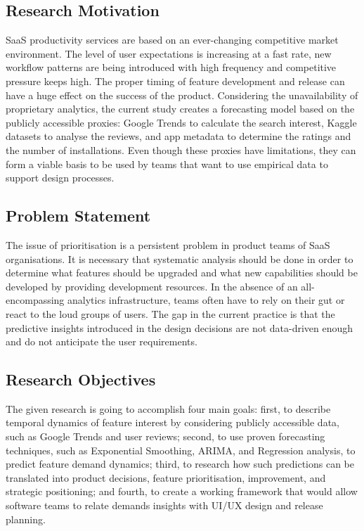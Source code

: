\subsection{Research Motivation}
SaaS productivity services are based on an ever-changing competitive market environment. The level of user expectations is increasing at a fast rate, new workflow patterns are being introduced with high frequency and competitive pressure keeps high. The proper timing of feature development and release can have a huge effect on the success of the product. Considering the unavailability of proprietary analytics, the current study creates a forecasting model based on the publicly accessible proxies: Google Trends to calculate the search interest, Kaggle datasets to analyse the reviews, and app metadata to determine the ratings and the number of installations. Even though these proxies have limitations, they can form a viable basis to be used by teams that want to use empirical data to support design processes.

\subsection{Problem Statement}
The issue of prioritisation is a persistent problem in product teams of SaaS organisations. It is necessary that systematic analysis should be done in order to determine what features should be upgraded and what new capabilities should be developed by providing development resources. In the absence of an all-encompassing analytics infrastructure, teams often have to rely on their gut or react to the loud groups of users. The gap in the current practice is that the predictive insights introduced in the design decisions are not data-driven enough and do not anticipate the user requirements.

\subsection{Research Objectives}
The given research is going to accomplish four main goals: first, to describe temporal dynamics of feature interest by considering publicly accessible data, such as Google Trends and user reviews; second, to use proven forecasting techniques, such as Exponential Smoothing, ARIMA, and Regression analysis, to predict feature demand dynamics; third, to research how such predictions can be translated into product decisions, feature prioritisation, improvement, and strategic positioning; and fourth, to create a working framework that would allow software teams to relate demands insights with UI/UX design and release planning.


